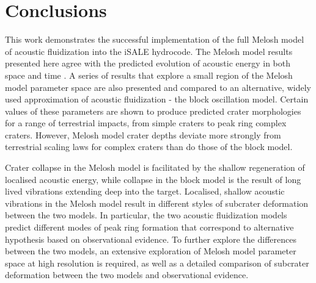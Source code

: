 \section{Conclusions}

This work demonstrates the successful implementation of the full Melosh model of acoustic fluidization into the iSALE hydrocode. The Melosh model results presented here agree with the predicted evolution of acoustic energy in both space and time \citep{melosh1979acoustic}. A series of results that explore a small region of the Melosh model parameter space are also presented and compared to an alternative, widely used approximation of acoustic fluidization - the block oscillation model. Certain values of these parameters are shown to produce predicted crater morphologies for a range of terrestrial impacts, from simple craters to peak ring complex craters. However, Melosh model crater depths deviate more strongly from terrestrial scaling laws for complex craters than do those of the block model.

Crater collapse in the Melosh model is facilitated by the shallow regeneration of localised acoustic energy, while collapse in the block model is the result of long lived vibrations extending deep into the target. Localised, shallow acoustic vibrations in the Melosh model result in different styles of subcrater deformation between the two models. In particular, the two acoustic fluidization models predict different modes of peak ring formation that correspond to alternative hypothesis based on observational evidence. To further explore the differences between the two models, an extensive exploration of Melosh model parameter space at high resolution is required, as well as a detailed comparison of subcrater deformation between the two models and observational evidence. 